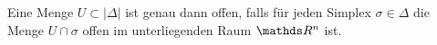 \begin{Def}
  Eine Menge $U \subset \left| \Delta \right|$ ist genau dann offen,
  falls für jeden Simplex $\sigma \in \Delta$ die Menge
  $U \cap \sigma$ offen im unterliegenden Raum $\R^n$ ist.
\end{Def}

























